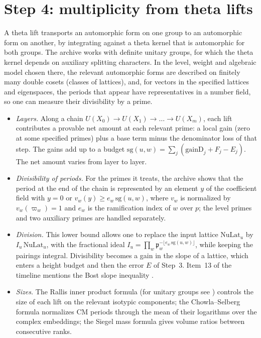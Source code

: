 \documentclass[11pt]{article}
\begin{document}
\section{Step 4: multiplicity from theta lifts}\label{sec:s4}
A theta lift transports an automorphic form on one group to an automorphic form on another, by integrating against a theta kernel that is automorphic for both groups. The archive works with definite unitary groups, for which the theta kernel depends on auxiliary splitting characters. In the level, weight and algebraic model chosen there, the relevant automorphic forms are described on finitely many double cosets (classes of lattices), and, for vectors in the specified lattices and eigenspaces, the periods that appear have representatives in a number field, so one can measure their divisibility by a prime.

\begin{itemize}
\item \emph{Layers.} Along a chain $U(X_0)\to U(X_1)\to\dots\to U(X_m)$, each lift contributes a provable net amount at each relevant prime: a local gain (zero at some specified primes) plus a base term minus the denominator loss of that step. The gains add up to a budget $\mathrm{sg}(u,w)=\sum_j(\mathrm{gainD}_j+F_j-E_j)$. The net amount varies from layer to layer.
\item \emph{Divisibility of periods.} For the primes it treats, the archive shows that the period at the end of the chain is represented by an element $y$ of the coefficient field with $y=0$ or $v_w(y)\ge e_w\,\mathrm{sg}(u,w)$, where $v_w$ is normalized by $v_w(\varpi_w)=1$ and $e_w$ is the ramification index of $w$ over $p$; the level primes and two auxiliary primes are handled separately.
\item \emph{Division.} This lower bound allows one to replace the input lattice $\mathrm{NuLat}_u$ by $I_u\,\mathrm{NuLat}_u$, with the fractional ideal $I_u=\prod_w\mathfrak p_w^{-\lfloor e_w\,\mathrm{sg}(u,w)\rfloor}$, while keeping the pairings integral. Divisibility becomes a gain in the slope of a lattice, which enters a height budget and then the error $E$ of Step~3. Item~13 of the timeline mentions the Bost slope inequality \cite{bost}.
\item \emph{Sizes.} The Rallis inner product formula (for unitary groups see \cite{hks}) controls the size of each lift on the relevant isotypic components; the Chowla--Selberg formula \cite{cs} normalizes CM periods through the mean of their logarithms over the complex embeddings; the Siegel mass formula gives volume ratios between consecutive ranks.
\end{itemize}
\end{document}
